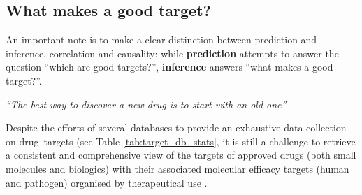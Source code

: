 \subsection{What makes a good target?}

An important note is to make a clear distinction between prediction and inference, correlation and causality: while \textbf{prediction} attempts to answer the question ``which are good targets?'', \textbf{inference} answers ``what makes a good target?''.

\begin{center}
\emph{``The best way to discover a new drug is to start with an old one''}
\end{center}
\medskip

Despite the efforts of several databases to provide an exhaustive data collection on drug--targets (see Table \ref{tab:target_db_stats}, it is still a challenge to retrieve a consistent and comprehensive view of the targets of approved drugs (both small molecules and biologics) with their associated molecular efficacy targets (human and pathogen) organised by therapeutical use \cite{santos2016}. 

